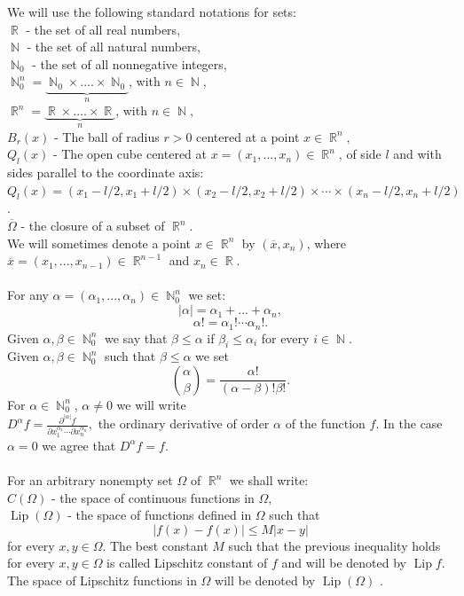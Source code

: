 \documentclass[12pt]{article}
\theoremstyle{definition}
\DeclareMathOperator\Lip{Lip}
\DeclareMathOperator\rr{\mathbb{R}}
\DeclareMathOperator\nn{\mathbb{N}}
\begin{document}
We will use the following standard notations for sets:\\
$\rr$ - the set of all real numbers,\\
$\nn$ - the set of all natural numbers,\\
$\nn_0$ - the set of all nonnegative integers,\\
$\nn_0^n=\underbrace{\nn_0 \times ....\times \nn_0}_{n}$, with $n \in \nn,$\\
$\rr^n=\underbrace{\rr \times ....\times \rr}_{n}$, with $n \in \nn,$\\
$B_r(x)$ - The ball of radius $r>0$ centered at a point $x\in \rr^n,$ \\ 
$Q_l(x)$ - The open cube centered at $x=(x_1,...,x_n) \in \rr^n$, of side $l$ and with sides parallel to the coordinate axis: $Q_l(x)= (x_1-l/2,x_1+l/2) \times (x_2-l/2,x_2+l/2) \times \cdots \times (x_n-l/2,x_n+l/2)$.\\
$\overline \Omega$ - the closure of a subset of $\rr^n$. \\
We will sometimes denote a point $x \in \rr^n$ by $(\overline x ,x_n)$, where $\overline x=(x_1,...,x_{n-1}) \in \rr^{n-1}$ and $x_n \in \rr.$\\\\
For any $\alpha=(\alpha_1,...,\alpha_n) \in \nn_0^n$ we set:
\[ |\alpha|=\alpha_1+...+\alpha_n,\]
\[ \alpha!=\alpha_1!\cdots\alpha_n!.\]
Given $\alpha,\beta \in \nn_0^n$ we say that $\beta\le \alpha$ if $\beta_i\le\alpha_i$ for every $i \in \nn.$\\
Given $\alpha,\beta \in \nn_0^n$ such that $\beta \le \alpha$ we set 
\[ {\alpha \choose \beta} = \frac{\alpha!}{(\alpha-\beta)!\beta!}. \]
For $\alpha \in \nn_0^n$, $\alpha \neq0$ we will write\\
$D^\alpha f=\frac{\partial^{|\alpha|}f}{\partial x_1^{\alpha_1}\dotsm\partial x_n^{\alpha_n}},$ the ordinary derivative of order $\alpha$ of the function $f.$  In the case $\alpha=0$ we agree that $D^\alpha f=f.$ \\\\
For an arbitrary nonempty set $\Omega$ of $\rr^n$ we shall write:\\
$C(\Omega)$ - the space of continuous functions in $\Omega,$\\
$\Lip(\Omega)$ - the space of functions defined in $\Omega$ such that
\[ |f(x)-f(x)|\le M |x-y|\]
for every $x,y \in \Omega$. The best constant $M$ such that the previous inequality holds for every $x,y \in \Omega$ is called Lipschitz constant of $f$ and will be denoted by $\Lip f.$ The space of Lipschitz functions in $\Omega$ will be denoted by  $\Lip(\Omega)$ .\\\\
\end{document}
